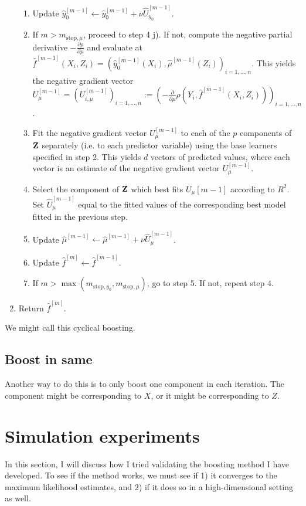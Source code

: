 \begin{algorithm}
\begin{enumerate}
\begin{enumerate}
        \item Update $\hat{y}_0^{[m-1]}\gets\hat{y}_0^{[m-1]}+\nu\hat{U}_{y_0}^{[m-1]}$.
        \item If $m>m_{\text{stop},\mu}$, proceed to step 4 j). If not, compute the negative partial derivative $-\frac{\partial\rho}{\partial \mu}$ and evaluate at $\hat{f}^{[m-1]}(X_i,Z_i)=\left(\hat{y}_0^{[m-1]}(X_i),\hat{\mu}^{[m-1]}(Z_i)\right)_{i=1,\ldots,n}$. This yields the negative gradient vector $U_{\mu}^{[m-1]}=\left(U_{i,\mu}^{[m-1]}\right)_{i=1,\ldots,n}:=\left(-\frac{\partial}{\partial \mu}\rho\left(Y_i,\hat{f}^{[m-1]}(X_i,Z_i)\right)\right)_{i=1,\ldots,n}$.
        \item Fit the negative gradient vector $U_{\mu}^{[m-1]}$ to each of the $p$ components of $\mathbf{Z}$ separately (i.e. to each predictor variable) using the base learners specified in step 2. This yields $d$ vectors of predicted values, where each vector is an estimate of the negative gradient vector $U_{\mu}^{[m-1]}$.
        \item Select the component of $\mathbf{Z}$ which best fits $U_{\mu}{[m-1]}$ according to $R^2$. Set $\hat{U}_{\mu}^{[m-1]}$ equal to the fitted values of the corresponding best model fitted in the previous step.
        \item Update $\hat{\mu}^{[m-1]}\gets\hat{\mu}^{[m-1]}+\nu\hat{U}_{\mu}^{[m-1]}$.
        \item Update $\hat{f}^{[m]}\gets\hat{f}^{[m-1]}$.
        \item If $m>\max(m_{\text{stop},y_0},m_{\text{stop},\mu})$, go to step 5. If not, repeat step 4.
    \end{enumerate}
    \item Return $\hat{f}^{[m]}$.
\end{enumerate}
\end{algorithm}
We might call this cyclical boosting.

\subsection{Boost in same}
Another way to do this is to only boost one component in each iteration. The component might be corresponding to $X$, or it might be corresponding to $Z$.




\section{Simulation experiments}
In this section, I will discuss how I tried validating the boosting method I have developed. To see if the method works, we must see if 1) it converges to the maximum likelihood estimates, and 2) if it does so in a high-dimensional setting as well.


